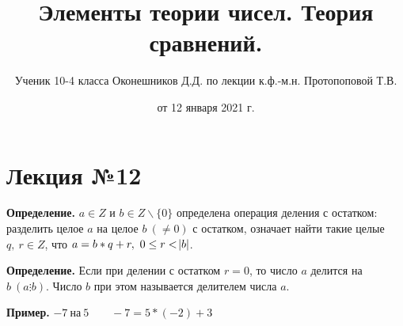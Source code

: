 \documentclass{article}
\begin{document}

  \title{Элементы теории чисел. Теория сравнений.}
  \author{Ученик 10-4 класса Оконешников Д.Д. по лекции к.ф.-м.н. Протопоповой Т.В.}
  \date{от 12 января 2021 г.}
  \maketitle

  \section{Лекция №12}
  
  \textbf{Определение.} \( a \in Z \) и \( b \in Z \backslash \{0\} \) определена операция деления с остатком: разделить целое \( a \) на целое \(b\ (\neq 0) \) с остатком, 
  означает найти такие целые \( q,\ r \in Z \), что \(a=b*q+r,\ 0 \leq r < \abs{b} \).

  \textbf{Определение.} Если при делении с остатком \( r = 0 \), то число \( a \) делится на \( b\ (a \vdots b) \). Число \( b \) при этом называется делителем числа \( a \).

  \textbf{Пример.} \( -7\ \textrm{на}\ 5 \qquad -7 = 5*(-2)+3 \)
\end{document}
